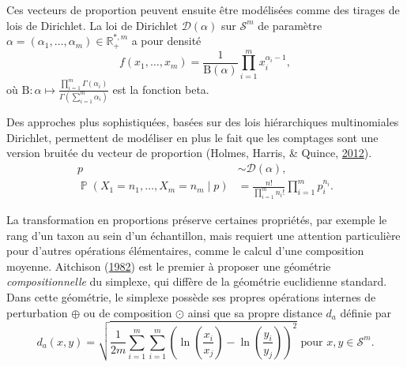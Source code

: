 \documentclass[12pt,a4paper]{reedthesis}
\newcommand \RR {\mathbb{R}}
\DeclareMathOperator*{\prob}{\mathbb{P}}
\newcommand \PP [1]{\prob\left({#1}\right)}
\theoremstyle{definition}
\theoremstyle{definition}
\theoremstyle{definition}
\theoremstyle{remark}
\begin{document}
Ces vecteurs de proportion peuvent ensuite être modélisées comme des tirages de lois de Dirichlet. La loi de Dirichlet \(\mathcal{D}(\alpha)\) sur \(\mathcal{S}^m\) de paramètre \(\alpha = (\alpha_1, \ldots, \alpha_m) \in \RR_+^{*,m}\) a pour densité
\begin{equation*}
f(x_1, \ldots, x_m) = \frac{1}{\text{B}(\alpha)} \prod_{i=1}^m x_i^{\alpha_i-1},
\end{equation*}
où \(\text{B} : \alpha \mapsto \frac{\prod_{i=1}^m\Gamma(\alpha_i)}{\Gamma\left(\sum_{i=1}^m \alpha_i\right)}\) est la fonction beta.

Des approches plus sophistiquées, basées sur des lois hiérarchiques multinomiales Dirichlet, permettent de modéliser en plus le fait que les comptages sont une version bruitée du vecteur de proportion (Holmes, Harris, \& Quince, \protect\hyperlink{ref-holmes2012dirichlet}{2012}).
\begin{equation*}
\begin{aligned}
p & \sim \mathcal{D}(\alpha), \\
\PP{X_1 = n_1, \ldots, X_m = n_m\mid p} & = \frac{n!}{\prod_{i=1}^m n_i!}\prod_{i=1}^m p_i^{n_i}.
\end{aligned}
\end{equation*}
\newline

La transformation en proportions préserve certaines propriétés, par exemple le rang d'un taxon au sein d'un échantillon, mais requiert une attention particulière pour d'autres opérations élémentaires, comme le calcul d'une composition moyenne. Aitchison (\protect\hyperlink{ref-aitchison1982statistical}{1982}) est le premier à proposer une géométrie \emph{compositionnelle} du simplexe, qui diffère de la géométrie euclidienne standard. Dans cette géométrie, le simplexe possède ses propres opérations internes de perturbation \(\oplus\) ou de composition \(\odot\) ainsi que sa propre distance \(d_a\) définie par
\begin{equation*}
d_a(x, y) = \sqrt{\frac{1}{2m}\sum_{i=1}^m\sum_{i=1}^m\left(\ln\left(\frac{x_i}{x_j}\right)-\ln\left(\frac{y_i}{y_j}\right)\right)^2} \text{ pour } x,y\in\mathcal{S}^m.
\end{equation*}
\newline
\end{document}
